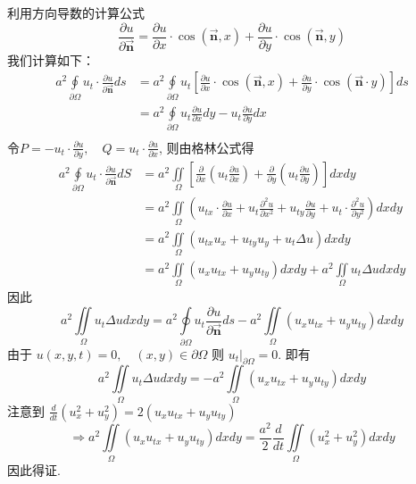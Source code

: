 \begin{questions}
\begin{solution}
利用方向导数的计算公式
$$\frac{\partial u}{\partial \vec{\boldsymbol n}}=\frac{\partial u}{\partial x} \cdot \cos (\vec{\boldsymbol n}, x)+\frac{\partial u}{\partial y} \cdot \cos (\vec{\boldsymbol n}, y) $$
我们计算如下：
$$
\begin{aligned}
a^{2} \oint\limits_{\partial \Omega}u_{t} \cdot \frac{\partial u}{\partial \vec{\boldsymbol n}} d s&=a^{2} \oint\limits_{\partial \Omega} u_{t}\left[\frac{\partial u}{\partial x} \cdot \cos (\vec{\boldsymbol n}, x)+\frac{\partial u}{\partial y} \cdot \cos (\vec{\boldsymbol n} \cdot y)\right] d s \\
&= a^{2} \oint\limits_{\partial \Omega} u_{t} \frac{\partial u}{\partial x} d y-u_{t} \frac{\partial u}{\partial y} d x \\
\end{aligned}
$$
令$P=-u_{t} \cdot \frac{\partial u}{\partial y} ,\quad Q=u_{t} \cdot \frac{\partial u}{\partial x}$,
则由格林公式得
$$
\begin{aligned}
a^{2} \oint\limits_{\partial \Omega}u_{t} \cdot \frac{\partial u}{\partial \vec{\boldsymbol n}} d S&=a^{2} \iint\limits_{\Omega} \left[\frac{\partial}{\partial x}\left(u_{t} \frac{\partial u}{\partial x}\right)+\frac{\partial}{\partial y}\left(u_{t} \frac{\partial u}{\partial y}\right)\right] d x d y \\
&=a^{2} \iint\limits_{\Omega}\left(u_{t x} \cdot \frac{\partial u}{\partial x}+u_{t} \frac{\partial^{2} u}{\partial x^{2}}+u_{t y} \frac{\partial u}{\partial y}+u_{t} \cdot \frac{\partial^{2} u}{\partial y^{2}}\right) d x d y \\
&=a^{2} \iint\limits_{\Omega}\left(u_{t x} u_{x}+u_{t y} u_{y}+u_{t} \Delta u\right) d x d y \\
&=a^{2} \iint\limits_{\Omega}\left(u_{x} u_{t x}+u_{y} u_{t y}\right) d x d y+a^{2} \iint\limits _{\Omega} u_{t} \Delta u d x d y
\end{aligned}
$$
因此 
$$ a^{2} \iint\limits_{\Omega} u_{t} \Delta u d x d y=a^{2} \oint\limits_{\partial \Omega} u_{t} \frac{\partial u}{\partial \vec{\boldsymbol n}} d s-a^{2} \iint\limits_{\Omega}\left(u_{x} u_{tx} +u_{y} u_{t y}\right) d x d y $$ 
由于 $ u(x, y, t)=0 ,\quad(x, y) \in \partial \Omega $
则 $ \left.u_{t}\right|_{\partial \Omega}=0 $.
即有 $$ a^{2} \iint\limits_{\Omega} u_{t} \Delta u d x d y=-a^{2} \iint\limits_{\Omega}\left(u_{x} u_{t x}+u_{y} u_{t y}\right) d x d y $$
 注意到 $ \frac{d}{d t}\left(u_{x}^{2}+u_{y}^{2}\right)=2\left(u_{x} u_{t x}+u_{y} u_{t y}\right) $
$$
\Rightarrow a^{2} \iint\limits_{\Omega}\left(u_{x} u_{t x}+u_{y} u_{t y}\right) d x d y=\frac{a^{2}}{2} \frac{d}{d t} \iint\limits_{\Omega}\left(u_{x}^{2}+u_{y}^{2}\right) d x d y
$$
因此得证.

\end{solution}
\end{questions}